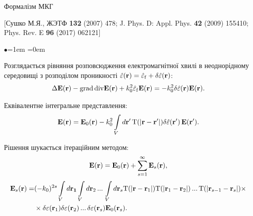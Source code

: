 \documentclass[10pt]{beamer}
\begin{document}
\appendix

\begin{frame}{Формалізм МКГ}
\footnotesize

[Сушко М.Я., ЖЭТФ {\bf 132} (2007) 478; J. Phys. D: Appl. Phys. {\bf 42} (2009) 155410; Phys. Rev. E {\bf 96} (2017) 062121]

\begin{list}{$\bullet$}{\leftmargin=1em \itemindent=0em}
\item
Розглядається рівняння розповсюдження електромагнітної хвилі в неоднорідному середовищі з розподілом проникності $\hat{\varepsilon}({\bf r}) = \hat{\varepsilon}_{\rm f} + \delta\hat{\varepsilon}({\bf r})$:
\begin{equation} \label{eq:propogate_eq}
\Delta {\bf E} ({\bf r}) - {\rm grad}\, {\rm div} {\bf E} ({\bf r}) + k_0^{2}\hat{\varepsilon}_{\rm f} {\bf E} ({\bf r})  = - k_{0}^{2} \delta
\hat{\varepsilon} ({\bf r}) {\bf E} ({\bf r}).
\end{equation}

\item 
Еквівалентне інтегральне представлення:
\begin{equation}\label{eq:integral_field}
{\bf E}({\rm {\bf r}}) = {\bf E}_{0} ({\bf r}) -
k_{0}^{2} \int\limits_{V} d{\bf r}'\, {\rm T}(|{\bf r} - {\bf r}'|)
\delta \hat{\varepsilon} ({\bf r}')\, {\bf E}({\bf r}').
\end{equation}

\item 
Рішення шукається ітераційним методом:
\begin{equation}\label{eq:iterationE}
{\bf E} ({\bf r}) = {\bf E}_0 ({\bf r}) +
\sum\limits_{s=1}^{\infty} {\bf E}_s ({\bf r}),
\end{equation}
\begin{equation*}
\begin{split}
{\bf E}_s ({\bf r}) =& (- k_0)^{2s} \int\limits_V d{\bf r_1}
\int\limits_V d{\bf r}_2 \,...\, \int\limits_V d{\bf r}_s
{\rm T}(|{\bf r} - {\bf r}_1|) {\rm T}(|{\bf r}_1 - {\bf r}_2|)
\,...\, {\rm T}(|{\bf r}_{s-1} - {\bf r}_s|) \times \\
&\times \delta{\varepsilon} ({\bf r}_1) \delta{\varepsilon} ({\bf r}_2)
\,...\, \delta{\varepsilon} ({\bf r}_s) {\bf E}_0 ({\bf r}_s).
\end{split}
\end{equation*}

\end{list}

\end{frame}
\end{document}
